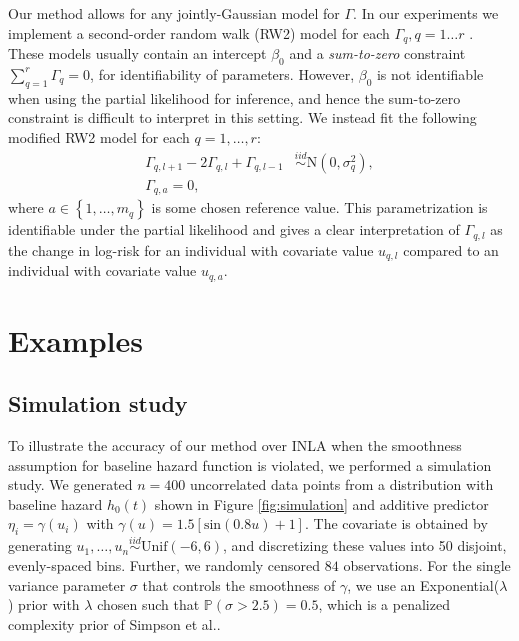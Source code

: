 \documentclass[num-refs,serif,10pt]{wiley-article}
\begin{document}
Our method allows for any jointly-Gaussian model for $\Gamma$. In our experiments we implement a second-order random walk (RW2) model for each $\Gamma_{q},q = 1\ldots r$ \cite{rw2}. These models usually contain an intercept $\beta_{0}$ and a \emph{sum-to-zero} constraint $\sum_{q=1}^{r}\Gamma_{q} = 0$, for identifiability of parameters. However, $\beta_{0}$ is not identifiable when using the partial likelihood for inference, and hence the sum-to-zero constraint is difficult to interpret in this setting. We instead fit the following modified RW2 model for each $q = 1,\ldots,r$:
\begin{equation}\begin{aligned}\label{eqn:rw2}
\Gamma_{q,l+1} - 2\Gamma_{q,l} + \Gamma_{q,l-1} &\overset{iid}{\sim}\text{N}\left( 0,\sigma^{2}_{q}\right), \\
\Gamma_{q,a} = 0,
\end{aligned}\end{equation}
where $a\in\left\lbrace 1,\ldots,m_{q}\right\rbrace$ is some chosen reference value. This parametrization is identifiable under the partial likelihood and gives a clear interpretation of $\Gamma_{q,l}$ as the change in log-risk for an individual with covariate value $u_{q,l}$ compared to an individual with covariate value $u_{q,a}$. 



\section{Examples}\label{sec:example}

\subsection{Simulation study}\label{subsec:sim}

To illustrate the accuracy of our method over INLA when the smoothness assumption for baseline hazard function is violated, we performed a simulation study. We generated $n = 400$ uncorrelated data points from a distribution with baseline hazard $h_{0}(t)$ shown in Figure \ref{fig:simulation} and additive predictor $\eta_{i} = \gamma(u_{i})$ with $\gamma(u) = 1.5 [ \text{sin}(0.8u) + 1 ]$. The covariate is obtained by generating $u_{1},\ldots,u_{n}\overset{iid}{\sim}\text{Unif}(-6,6)$, and discretizing these values into 50 disjoint, evenly-spaced bins. Further, we randomly censored $84$ observations. For the single variance parameter $\sigma$ that controls the smoothness of $\gamma$, we use an Exponential($\lambda$) prior with $\lambda$ chosen such that $\mathbb{P}\left( \sigma > 2.5\right) = 0.5$, which is a penalized complexity prior of Simpson et al.\cite{pcprior}.
\end{document}
